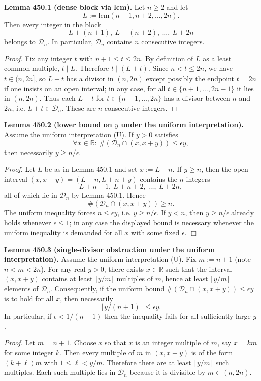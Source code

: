 \medskip
\noindent\textbf{Lemma 450.1 (dense block via lcm).}
Let $n\ge 2$ and let
\[L:=\mathrm{lcm}(n+1,n+2,\dots,2n).\]
Then every integer in the block
\[L+(n+1),\ L+(n+2),\ \dots,\ L+2n\]
belongs to $\mathcal D_n$. In particular, $\mathcal D_n$ contains $n$ consecutive integers.

\noindent\emph{Proof.}
Fix any integer $t$ with $n+1\le t\le 2n$. By definition of $L$ as a least common multiple, $t\mid L$. Therefore $t\mid (L+t)$. Since $n<t\le 2n$, we have $t\in(n,2n]$, so $L+t$ has a divisor in $(n,2n)$ except possibly the endpoint $t=2n$ if one insists on an open interval; in any case, for all $t\in\{n+1,\dots,2n-1\}$ it lies in $(n,2n)$.
Thus each $L+t$ for $t\in\{n+1,\dots,2n\}$ has a divisor between $n$ and $2n$, i.e. $L+t\in\mathcal D_n$.
These are $n$ consecutive integers. \hfill$\Box$

\medskip
\noindent\textbf{Lemma 450.2 (lower bound on $y$ under the uniform interpretation).}
Assume the uniform interpretation (U). If $y>0$ satisfies
\[\forall x\in\mathbb R:\ \#(\mathcal D_n\cap(x,x+y))\le \epsilon y,
\]
then necessarily $y\ge n/\epsilon$.

\noindent\emph{Proof.}
Let $L$ be as in Lemma 450.1 and set $x:=L+n$. If $y\ge n$, then the open interval $(x,x+y)=(L+n,L+n+y)$ contains the $n$ integers
\[L+n+1,\ L+n+2,\ \dots,\ L+2n,
\]
all of which lie in $\mathcal D_n$ by Lemma 450.1. Hence
\[\#(\mathcal D_n\cap(x,x+y))\ge n.
\]
The uniform inequality forces $n\le \epsilon y$, i.e. $y\ge n/\epsilon$.
If $y<n$, then $y\ge n/\epsilon$ already holds whenever $\epsilon\le 1$; in any case the displayed bound is necessary whenever the uniform inequality is demanded for all $x$ with some fixed $\epsilon$.
\hfill$\Box$

\medskip
\noindent\textbf{Lemma 450.3 (single-divisor obstruction under the uniform interpretation).}
Assume the uniform interpretation (U). Fix $m:=n+1$ (note $n<m<2n$). For any real $y>0$, there exists $x\in\mathbb R$ such that the interval $(x,x+y)$ contains at least $\lfloor y/m\rfloor$ multiples of $m$, hence at least $\lfloor y/m\rfloor$ elements of $\mathcal D_n$.
Consequently, if the uniform bound $\#(\mathcal D_n\cap(x,x+y))\le \epsilon y$ is to hold for all $x$, then necessarily
\[\lfloor y/(n+1)\rfloor \le \epsilon y.
\]
In particular, if $\epsilon<1/(n+1)$ then the inequality fails for all sufficiently large $y$.

\noindent\emph{Proof.}
Let $m=n+1$. Choose $x$ so that $x$ is an integer multiple of $m$, say $x=km$ for some integer $k$. Then every multiple of $m$ in $(x,x+y)$ is of the form $(k+\ell)m$ with $1\le \ell < y/m$. Therefore there are at least $\lfloor y/m\rfloor$ such multiples.
Each such multiple lies in $\mathcal D_n$ because it is divisible by $m\in(n,2n)$.

